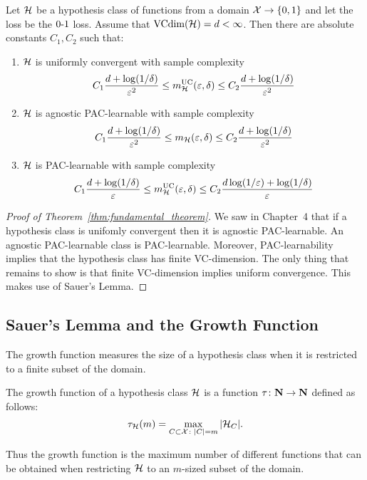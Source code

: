 \begin{theorem}
Let $\mathcal{H}$ be a hypothesis class of functions from a domain
$\mathcal{X} \rightarrow \{0, 1\}$ and let the loss be the $\operatorname{0-1}$ loss. Assume that
$\text{VCdim}(\mathcal{H}) = d < \infty$. Then there are absolute constants $C_1, C_2$
such that:
\begin{enumerate}
    \item $\mathcal{H}$ is uniformly convergent with sample complexity
        \[
            C_1 \frac{d + \log (1 / \delta)}{\varepsilon^2}
            \leq m_{\mathcal{H}}^{\text{UC}}(\varepsilon, \delta)
            \leq C_2 \frac{d + \log (1 / \delta)}{\varepsilon^2}
        \]
    \item $\mathcal{H}$ is agnostic PAC-learnable with sample complexity
        \[
            C_1 \frac{d + \log (1 / \delta)}{\varepsilon^2}
            \leq m_{\mathcal{H}}(\varepsilon, \delta)
            \leq C_2 \frac{d + \log (1 / \delta)}{\varepsilon^2}
        \]
    \item $\mathcal{H}$ is PAC-learnable with sample complexity
        \[
            C_1 \frac{d + \log (1 / \delta)}{\varepsilon}
            \leq m_{\mathcal{H}}^{\text{UC}}(\varepsilon, \delta)
            \leq C_2 \frac{d \log (1 / \varepsilon) + \log (1 / \delta)}{\varepsilon}
        \]
\end{enumerate}
\end{theorem}

\begin{proof}[Proof of Theorem~\ref{thm:fundamental_theorem}]
We saw in Chapter~4 that if a hypothesis class is unifomly convergent then it is
agnostic PAC-learnable. An agnostic PAC-learnable class is PAC-learnable. Moreover,
PAC-learnability implies that the hypothesis class has finite VC-dimension. The only
thing that remains to show is that finite VC-dimension implies uniform convergence.
This makes use of Sauer's Lemma.
\end{proof}

\subsection{Sauer's Lemma and the Growth Function}

The growth function measures the size of a hypothesis class when it is restricted to
a finite subset of the domain.
\begin{definition}
The growth function of a hypothesis class $\mathcal{H}$ is a function
$\tau \colon \mathbf{N} \rightarrow \mathbf{N}$ defined as follows:
\[
    \tau_{\mathcal{H}} (m) = \max_{C \subset \mathcal{X} \colon |C| = m} |\mathcal{H}_{C}|.
\]
\end{definition}
Thus the growth function is the maximum number of different functions that can be
obtained when restricting $\mathcal{H}$ to an $m$-sized subset of the domain.

